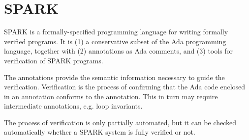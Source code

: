 \section*{SPARK}

SPARK is a formally-specified programming language for writing formally
verified programs. It is (1) a conservative subset of the Ada programming
language, together with (2) annotations as Ada comments, and (3) tools for
verification of SPARK programs.

The annotations provide the semantic information necessary to guide the
verification. Verification is the process of confirming that the Ada code
enclosed in an annotation conforms to the annotation. This in turn may require
intermediate annotations, e.g. loop invariants.

The process of verification is only partially automated, but it can be checked
automatically whether a SPARK system is fully verified or not.

